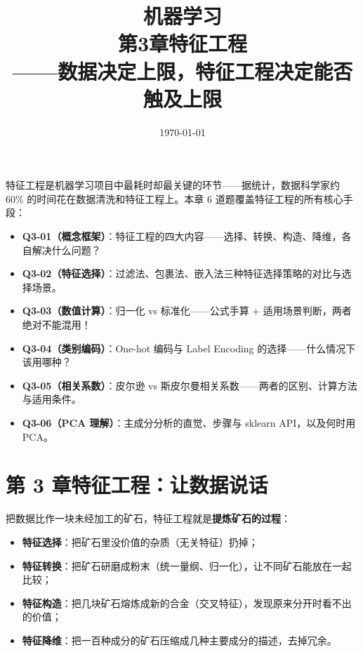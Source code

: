 \documentclass[a4paper,11pt]{ctexart}
\title{\textbf{机器学习\\第3章\quad 特征工程}\\[0.5em]
{\large\color{gray}——数据决定上限，特征工程决定能否触及上限}}
\date{\today}
\begin{document}
\maketitle

\begin{beginnerbox}
    特征工程是机器学习项目中最耗时却最关键的环节——据统计，数据科学家约 60\% 的时间花在数据清洗和特征工程上。本章 6 道题覆盖特征工程的所有核心手段：
    \begin{itemize}
        \item \textbf{Q3-01（概念框架）}：特征工程的四大内容——选择、转换、构造、降维，各自解决什么问题？
        \item \textbf{Q3-02（特征选择）}：过滤法、包裹法、嵌入法三种特征选择策略的对比与选择场景。
        \item \textbf{Q3-03（数值计算）}：归一化 vs 标准化——公式手算 + 适用场景判断，两者绝对不能混用！
        \item \textbf{Q3-04（类别编码）}：One-hot 编码与 Label Encoding 的选择——什么情况下该用哪种？
        \item \textbf{Q3-05（相关系数）}：皮尔逊 vs 斯皮尔曼相关系数——两者的区别、计算方法与适用条件。
        \item \textbf{Q3-06（PCA 理解）}：主成分分析的直觉、步骤与 sklearn API，以及何时用 PCA。
    \end{itemize}
\end{beginnerbox}

\section{第 3 章\quad 特征工程：让数据说话}

\begin{metaphorbox}
    把数据比作一块未经加工的矿石，特征工程就是\textbf{提炼矿石的过程}：
    \begin{itemize}
        \item \textbf{特征选择}：把矿石里没价值的杂质（无关特征）扔掉；
        \item \textbf{特征转换}：把矿石研磨成粉末（统一量纲、归一化），让不同矿石能放在一起比较；
        \item \textbf{特征构造}：把几块矿石熔炼成新的合金（交叉特征），发现原来分开时看不出的价值；
        \item \textbf{特征降维}：把一百种成分的矿石压缩成几种主要成分的描述，去掉冗余。
    \end{itemize}
\end{metaphorbox}
\end{document}
